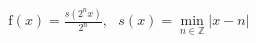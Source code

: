 \documentclass[preview]{standalone}
\begin{document}
\begin{align*}
\text{f}(x) = \frac{s(2^n x)}{2^n}, \text{  }s(x) = \min_{n \in \mathbb{Z}} |x - n|
\end{align*}
\end{document}
